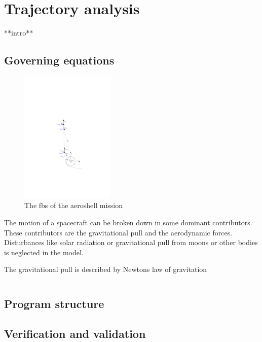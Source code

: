 \section{Trajectory analysis} \label{ch:trajectory}

**intro**

\subsection{Governing equations}

\begin{figure}
		\centering
		\includegraphics[width = 0.4\textwidth]{Figure/orbital_mechanics.pdf}
		\caption{The \gls{fbs} of the aeroshell mission}
		\label{fig:orb}
\end{figure}

The motion of a spacecraft can be broken down in some dominant contributors. These contributors are the gravitational pull and the aerodynamic forces. Disturbances like solar radiation or gravitational pull from moons or other bodies is neglected in the model.

The gravitational pull is described by Newtons law of gravitation

\begin{equation}

\end{equation}

\subsection{Program structure}

\subsection{Verification and validation}